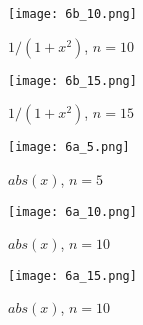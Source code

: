 \documentclass{article}
\begin{document}
\begin{figure}[H] 
\centering
\texttt{[image: 6b\_10.png]}
\caption{$1 / (1+x^2)$, $n = 10$}
\label{1_(1+x^2)_10}
\end{figure}

\begin{figure}[H] 
\centering
\texttt{[image: 6b\_15.png]}
\caption{$1 / (1+x^2)$, $n = 15$}
\label{1_(1+x^2)_15}
\end{figure}

\begin{figure}[H] 
\centering
\texttt{[image: 6a\_5.png]}
\caption{$abs(x)$, $n = 5$}
\label{abs(x)_5}
\end{figure}

\begin{figure}[H] 
\centering
\texttt{[image: 6a\_10.png]}
\caption{$abs(x)$, $n = 10$}
\label{abs(x)_10}
\end{figure}

\begin{figure}[H] 
\centering
\texttt{[image: 6a\_15.png]}
\caption{$abs(x)$, $n = 10$}
\label{abs(x)_15}
\end{figure}
\end{document}
